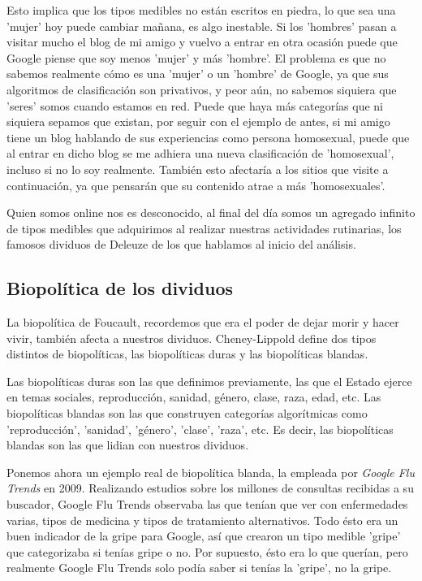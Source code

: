 \documentclass[11pt]{article}
\begin{document}
Esto implica que los tipos medibles no están escritos en piedra, lo que sea una 'mujer' hoy puede cambiar mañana, es algo inestable. Si los 'hombres' pasan a visitar mucho el blog de mi amigo y vuelvo a entrar en otra ocasión puede que Google piense que soy menos 'mujer' y más 'hombre'. El problema es que no sabemos realmente cómo es una 'mujer' o un 'hombre' de Google, ya que sus algoritmos de clasificación son privativos, y peor aún, no sabemos siquiera que 'seres' somos cuando estamos en red. Puede que haya más categorías que ni siquiera sepamos que existan, por seguir con el ejemplo de antes, si mi amigo tiene un blog hablando de sus experiencias como persona homosexual, puede que al entrar en dicho blog se me adhiera una nueva clasificación de 'homosexual', incluso si no lo soy realmente. También esto afectaría a los sitios que visite a continuación, ya que pensarán que su contenido atrae a más 'homosexuales'.

Quien somos online nos es desconocido, al final del día somos un agregado infinito de tipos medibles que adquirimos al realizar nuestras actividades rutinarias, los famosos dividuos de Deleuze de los que hablamos al inicio del análisis.
\subsection{Biopolítica de los dividuos}
La biopolítica de Foucault, recordemos que era el poder de dejar morir y hacer vivir, también afecta a nuestros dividuos. Cheney-Lippold define dos tipos distintos de biopolíticas, las biopolíticas duras y las biopolíticas blandas.

Las biopolíticas duras son las que definimos previamente, las que el Estado ejerce en temas sociales, reproducción, sanidad, género, clase, raza, edad, etc. Las biopolíticas blandas son las que construyen categorías algorítmicas como 'reproducción', 'sanidad', 'género', 'clase', 'raza', etc. Es decir, las biopolíticas blandas son las que lidian con nuestros dividuos.

Ponemos ahora un ejemplo real de biopolítica blanda, la empleada por \textit{Google Flu Trends} en 2009. Realizando estudios sobre los millones de consultas recibidas a su buscador, Google Flu Trends observaba las que tenían que ver con enfermedades varias, tipos de medicina y tipos de tratamiento alternativos. Todo ésto era un buen indicador de la gripe para Google, así que crearon un tipo medible 'gripe' que categorizaba si tenías gripe o no. Por supuesto, ésto era lo que querían, pero realmente Google Flu Trends solo podía saber si tenías la 'gripe', no la gripe.  
\end{document}
